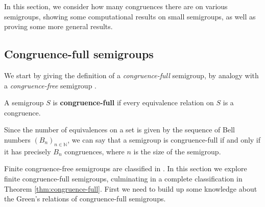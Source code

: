 In this section, we consider how many congruences there are on various
semigroups, showing some computational results on small semigroups, as well as
proving some more general results.

\subsection{Congruence-full semigroups}

We start by giving the definition of a \textit{congruence-full} semigroup, by
analogy with a \textit{congruence-free} semigroup \cite[\S3.7]{howie}.

\begin{definition}
  A semigroup $S$ is \textbf{congruence-full} if every equivalence relation on
  $S$ is a congruence.
\end{definition}

Since the number of equivalences on a set is given by the sequence of Bell
numbers $(B_n)_{n \in \mathbb{N}}$, we can say that a semigroup is
congruence-full if and only if it has precisely $B_n$ congruences, where $n$ is
the size of the semigroup.

Finite congruence-free semigroups are classified in \cite[3.7]{howie}.
In this section we explore finite congruence-full semigroups, culminating in a
complete classification in Theorem \ref{thm:congruence-full}.  First we need to
build up some knowledge about the Green's relations of congruence-full
semigroups.

